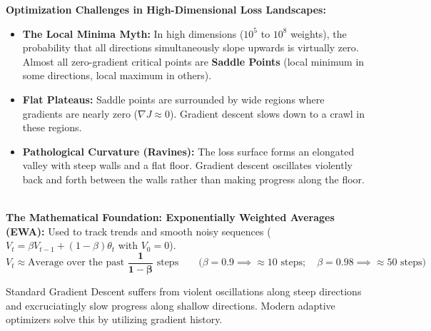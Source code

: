 \documentclass[10pt,a4paper]{article}
\begin{document}
\begin{tcolorbox}[
    colframe=accentred, colback=white, arc=1.3mm, boxrule=0.5pt,
    left=5pt, right=5pt, top=2pt, bottom=2pt
]
\footnotesize
\textbf{Optimization Challenges in High-Dimensional Loss Landscapes:}
\begin{itemize}[leftmargin=8pt, itemsep=1pt, topsep=0pt]
    \item \textbf{The Local Minima Myth:} In high dimensions ($10^5$ to $10^8$ weights), the probability that all directions simultaneously slope upwards is virtually zero. Almost all zero-gradient critical points are \textbf{Saddle Points} (local minimum in some directions, local maximum in others).
    \item \textbf{Flat Plateaus:} Saddle points are surrounded by wide regions where gradients are nearly zero ($\nabla J \approx 0$). Gradient descent slows down to a crawl in these regions.
    \item \textbf{Pathological Curvature (Ravines):} The loss surface forms an elongated valley with steep walls and a flat floor. Gradient descent oscillates violently back and forth between the walls rather than making progress along the floor.
\end{itemize}
\hrulefill\\[1pt]
\textbf{The Mathematical Foundation: Exponentially Weighted Averages (EWA):}
Used to track trends and smooth noisy sequences ($V_t = \beta V_{t-1} + (1 - \beta) \theta_t$ with $V_0 = 0$).
\[
V_t \approx \text{Average over the past } \mathbf{\frac{1}{1 - \beta}} \text{ steps} \qquad \Big(\beta = 0.9 \implies \approx 10 \text{ steps}; \quad \beta = 0.98 \implies \approx 50 \text{ steps}\Big)
\]
\end{tcolorbox}

\newpage


\par\vspace{1pt}
Standard Gradient Descent suffers from violent oscillations along steep directions and excruciatingly slow progress along shallow directions. Modern adaptive optimizers solve this by utilizing gradient history.
\end{document}
